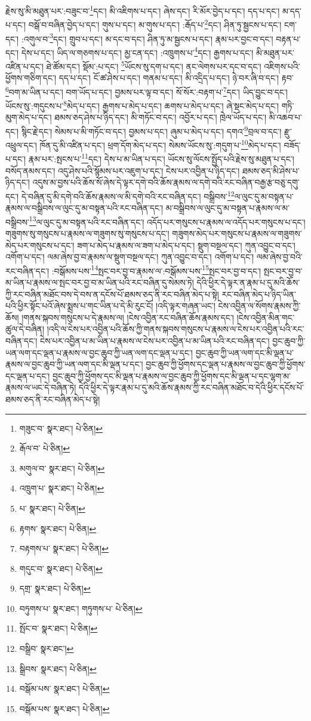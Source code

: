 རྗེས་སུ་མི་མཐུན་པར་:བཟུང་བ་\footnote{གཟུང་བ་  སྣར་ཐང་།  པེ་ཅིན། }དང་། མི་འཇིགས་པ་དང་། ཞེས་དང་། རི་མོར་བྱེད་པ་དང་། དད་པ་དང་། མ་དད་པ་དང་། བསྒོ་བ་བཞིན་བྱེད་པ་དང་། གུས་པ་དང་། མ་གུས་པ་དང་། :རྒོད་པ་\footnote{རྒོལ་བ་  པེ་ཅིན། }དང་། ཤིན་ཏུ་སྦྱངས་པ་དང་། ངག་དང་། :འགུལ་བ་\footnote{མགུལ་བ་  སྣར་ཐང་།  པེ་ཅིན། }དང་། གྲུབ་པ་དང་། མ་དང་བ་དང་། ཤིན་ཏུ་མ་སྦྱངས་པ་དང་། རྣམ་པར་བྱང་བ་དང་། བརྟན་པ་དང་། དེས་པ་དང་། ཡིད་ལ་གཅགས་པ་དང་། མྱ་ངན་དང་། :འཁྲུགས་པ་\footnote{འཁྲུག་པ་  སྣར་ཐང་།  པེ་ཅིན། }དང་། རྒྱགས་པ་དང་། མི་མཐུན་པར་འཛིན་པ་དང་། ཐེ་ཚོམ་དང་། སྡོམ་:པ་དང་། \footnote{པ་  སྣར་ཐང་།  པེ་ཅིན། }ཡོངས་སུ་དག་པ་དང་། ནང་ལེགས་པར་དང་བ་དང་། འཇིགས་པའི་ཕྱོགས་གཅིག་དང་། དད་པ་དང་། ངོ་ཚ་ཤེས་པ་དང་། གནམ་པ་དང་། མི་འདྲིད་པ་དང་། ཉེ་བར་ཞི་བ་དང་། རྟབ་\footnote{རྟགས་  སྣར་ཐང་།  པེ་ཅིན། }བག་མ་ཡིན་པ་དང་། བག་ཡོད་པ་དང་། བྱམས་པར་ལྟ་བ་དང་། སོ་སོར་:བརྟག་པ་\footnote{བརྟགས་པ་  སྣར་ཐང་།  པེ་ཅིན། }དང་། ཡིད་བྱུང་བ་དང་། ཡོངས་སུ་:གདུངས་པ་\footnote{གདུང་བ་  སྣར་ཐང་།  པེ་ཅིན། }མེད་པ་དང་། རྒྱགས་པ་མེད་པ་དང་། ཆགས་པ་མེད་པ་དང་། ཞེ་སྡང་མེད་པ་དང་། གཏི་མུག་མེད་པ་དང་། ཐམས་ཅད་ཤེས་པ་ཉིད་དང་། མི་གཏོང་བ་དང་། འབྱོར་པ་དང་། ཁྲེལ་ཡོད་པ་དང་། མི་འཆབ་པ་དང་། སྙིང་རྗེ་དང་། སེམས་པ་མི་གཏོང་བ་དང་། བྱམས་པ་དང་། ཞུམ་པ་མེད་པ་དང་། དགའ་\footnote{དགྲ་  སྣར་ཐང་།  པེ་ཅིན། }བྲལ་བ་དང་། རྫུ་འཕྲུལ་དང་། ཁོན་དུ་མི་འཛིན་པ་དང་། ཕྲག་དོག་མེད་པ་དང་། སེམས་ཡོངས་སུ་:གདུག་པ་\footnote{བཏུགས་པ་  སྣར་ཐང་། གཏུགས་པ་  པེ་ཅིན། }མེད་པ་དང་། བཟོད་པ་དང་། རྣམ་པར་:སྤངས་པ་\footnote{སྤོང་བ་  སྣར་ཐང་།  པེ་ཅིན། }དང་། དེས་པ་མ་ཡིན་པ་དང་། ཡོངས་སུ་ལོངས་སྤྱོད་པའི་རྗེས་སུ་མཐུན་པ་དང་། བསོད་ནམས་དང་། འདུ་ཤེས་པའི་སྙོམས་པར་འཇུག་པ་དང་། ངེས་པར་འབྱིན་པ་ཉིད་དང་། ཐམས་ཅད་མི་ཤེས་པ་ཉིད་དང་། འདུས་མ་བྱས་པའི་ཆོས་སོ་ཞེས་དེ་ལྟར་དགེ་བའི་ཆོས་རྣམས་ལ་དགེ་བའི་རང་བཞིན་བརྒྱ་རྩ་བཅུ་དགུ་དང་། དེ་བཞིན་དུ་མི་དགེ་བའི་ཆོས་རྣམས་ལ་མི་དགེ་བའི་རང་བཞིན་དང་། བསྒྲིབས་\footnote{བསྒྲིབ་  སྣར་ཐང་། }ལ་ལུང་དུ་མ་བསྟན་པ་རྣམས་ལ་བསྒྲིབས་ལ་ལུང་དུ་མ་བསྟན་པའི་རང་བཞིན་དང་། མ་བསྒྲིབས་ལ་ལུང་དུ་མ་བསྟན་པ་རྣམས་ལ་མ་བསྒྲིབས་\footnote{སྒྲིབས་  སྣར་ཐང་།  པེ་ཅིན། }ལ་ལུང་དུ་མ་བསྟན་པའི་རང་བཞིན་དང་། འདོད་པར་གསུངས་པ་རྣམས་ལ་འདོད་པར་གསུངས་པ་དང་། གཟུགས་སུ་གསུངས་པ་རྣམས་ལ་གཟུགས་སུ་གསུངས་པ་དང་། གཟུགས་མེད་པར་གསུངས་པ་རྣམས་ལ་གཟུགས་མེད་པར་གསུངས་པ་དང་། ཟག་པ་མེད་པ་རྣམས་ལ་ཟག་པ་མེད་པ་དང་། སྡུག་བསྔལ་དང་། ཀུན་འབྱུང་བ་དང་། འགོག་པ་དང་། ལམ་ཞེས་བྱ་བ་རྣམས་ལ་སྡུག་བསྔལ་དང་། ཀུན་འབྱུང་བ་དང་། འགོག་པ་དང་། ལམ་ཞེས་བྱ་བའི་རང་བཞིན་དང་། :བསྒོམས་པས་\footnote{བསྒོམ་པས་  སྣར་ཐང་།  པེ་ཅིན། }སྤང་བར་བྱ་བ་རྣམས་ལ་:བསྒོམས་པས་\footnote{བསྒོམ་པས་  སྣར་ཐང་།  པེ་ཅིན། }སྤང་བར་བྱ་བ་དང་། སྤང་བར་བྱ་བ་མ་ཡིན་པ་རྣམས་ལ་སྤང་བར་བྱ་བ་མ་ཡིན་པའི་རང་བཞིན་དུ་སེམས་ཏེ། དེའི་ཕྱིར་དེ་ལྟར་ན་རྣམ་པ་དུ་མའི་ཆོས་ཀྱི་རང་བཞིན་མཐོང་བས་དེ་བས་ན་དངོས་པོ་ཐམས་ཅད་ནི་རང་བཞིན་མེད་པ་སྟེ། རང་བཞིན་མེད་པ་ཉིད་ཡིན་པའི་ཕྱིར་སྟོང་པའོ་ཞེས་སྨྲས་པ་གང་ཡིན་པ་དེ་མི་རུང་ངོ། །འདི་ལྟར་གཞན་ཡང་། ངེས་འབྱིན་ལ་སོགས་རྣམས་ཀྱི་ཆོས། །གནས་སྐབས་གསུངས་པ་དེ་རྣམས་ལ། །ངེས་འབྱིན་རང་བཞིན་ཆོས་རྣམས་དང་། །ངེས་འབྱིན་མིན་གང་ཚུལ་དེ་བཞིན། །འདི་ལ་ངེས་པར་འབྱིན་པའི་ཆོས་ཀྱི་གནས་སྐབས་གསུངས་པ་རྣམས་ལ་ངེས་པར་འབྱིན་པའི་རང་བཞིན་དང་། ངེས་པར་འབྱིན་པ་མ་ཡིན་པ་རྣམས་ལ་ངེས་པར་འབྱིན་པ་མ་ཡིན་པའི་རང་བཞིན་དང་། བྱང་ཆུབ་ཀྱི་ཡན་ལག་དང་ལྡན་པ་རྣམས་ལ་བྱང་ཆུབ་ཀྱི་ཡན་ལག་དང་ལྡན་པ་དང་། བྱང་ཆུབ་ཀྱི་ཡན་ལག་དང་མི་ལྡན་པ་རྣམས་ལ་བྱང་ཆུབ་ཀྱི་ཡན་ལག་དང་མི་ལྡན་པ་དང་། བྱང་ཆུབ་ཀྱི་ཕྱོགས་དང་ལྡན་པ་རྣམས་ལ་བྱང་ཆུབ་ཀྱི་ཕྱོགས་དང་ལྡན་པ་དང་། བྱང་ཆུབ་ཀྱི་ཕྱོགས་དང་མི་ལྡན་པ་རྣམས་ལ་བྱང་ཆུབ་ཀྱི་ཕྱོགས་དང་མི་ལྡན་པ་དང་ལྷག་མ་རྣམས་ལ་ཡང་དེ་བཞིན་ཏེ། དེའི་ཕྱིར་དེ་ལྟར་རྣམ་པ་དུ་མའི་ཆོས་རྣམས་ཀྱི་རང་བཞིན་མཐོང་བ་དེའི་ཕྱིར་དངོས་པོ་ཐམས་ཅད་ནི་རང་བཞིན་མེད་པ་སྟེ། 